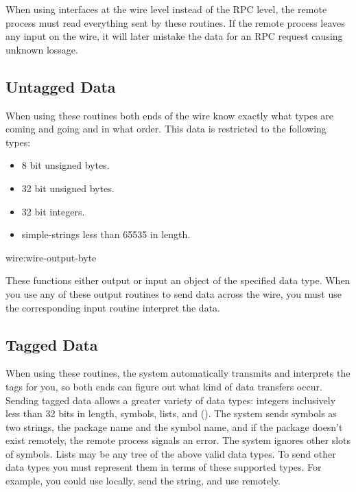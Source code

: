 When using interfaces at the wire level instead of the RPC level,
the remote process must read everything sent by these routines.  If
the remote process leaves any input on the wire, it will later
mistake the data for an RPC request causing unknown lossage.


\subsection{Untagged Data}

When using these routines both ends of the wire know exactly what types are
coming and going and in what order. This data is restricted to the following
types:

\begin{itemize}
\item
8 bit unsigned bytes.

\item
32 bit unsigned bytes.

\item
32 bit integers.

\item
simple-strings less than 65535 in length.
\end{itemize}

\begin{defun}{wire:}{wire-output-byte}{}
  
  These functions either output or input an object of the specified
  data type.  When you use any of these output routines to send data
  across the wire, you must use the corresponding input routine
  interpret the data.
\end{defun}


\subsection{Tagged Data}

When using these routines, the system automatically transmits and interprets
the tags for you, so both ends can figure out what kind of data transfers
occur.  Sending tagged data allows a greater variety of data types: integers
inclusively less than 32 bits in length, symbols, lists, and 
().  The system sends symbols as two strings, the
package name and the symbol name, and if the package doesn't exist remotely,
the remote process signals an error.  The system ignores other slots of
symbols.  Lists may be any tree of the above valid data types.  To send other
data types you must represent them in terms of these supported types.  For
example, you could use  locally, send the string, and use
 remotely.

